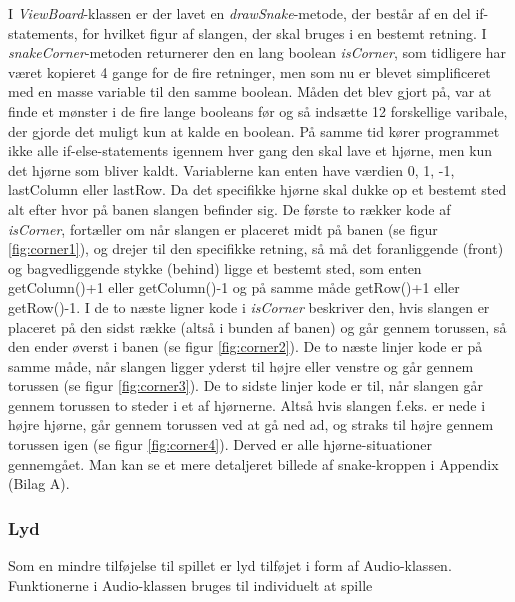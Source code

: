 I \textit{ViewBoard}-klassen er der lavet en \textit{drawSnake}-metode, der består af en del if-statements, for hvilket figur af slangen, der skal bruges i en bestemt retning. I \textit{snakeCorner}-metoden returnerer den en lang boolean \textit{isCorner}, som tidligere har været kopieret 4 gange for de fire retninger, men som nu er blevet simplificeret med en masse variable til den samme boolean. Måden det blev gjort på, var at finde et mønster i de fire lange booleans før og så indsætte 12 forskellige varibale, der gjorde det muligt kun at kalde en boolean. På samme tid kører programmet ikke alle if-else-statements igennem hver gang den skal lave et hjørne, men kun det hjørne som bliver kaldt. Variablerne kan enten have værdien 0, 1, -1, lastColumn eller lastRow. Da det specifikke hjørne skal dukke op et bestemt sted alt efter hvor på banen slangen befinder sig.
De første to rækker kode af \textit{isCorner}, fortæller om når slangen er placeret midt på banen (se figur \ref{fig:corner1}), og drejer til den specifikke retning, så må det foranliggende (front) og bagvedliggende stykke (behind) ligge et bestemt sted, som enten getColumn()+1 eller getColumn()-1 og på samme måde getRow()+1 eller getRow()-1. I de to næste ligner kode i \textit{isCorner} beskriver den, hvis slangen er placeret på den sidst række (altså i bunden af banen) og går gennem torussen, så den ender øverst i banen (se figur \ref{fig:corner2}).
De to næste linjer kode er på samme måde, når slangen ligger yderst til højre eller venstre og går gennem torussen (se figur \ref{fig:corner3}).
De to sidste linjer kode er til, når slangen går gennem torussen to steder i et af hjørnerne. Altså hvis slangen f.eks. er nede i højre hjørne, går gennem torussen ved at gå ned ad, og straks til højre gennem torussen igen (se figur \ref{fig:corner4}). 
Derved er alle hjørne-situationer gennemgået.
Man kan se et mere detaljeret billede af snake-kroppen i Appendix (Bilag A).
\begin{figure}[h]
	\centering
	\graphicspath{ {pics/} }
	\caption{}
	\hspace{0.05\textwidth}
	\hspace{0.05\textwidth}
	\hspace{0.05\textwidth}
\end{figure}

\subsubsection{Lyd}

Som en mindre tilføjelse til spillet er lyd tilføjet i form af Audio-klassen. Funktionerne i Audio-klassen bruges til individuelt at spille 	
